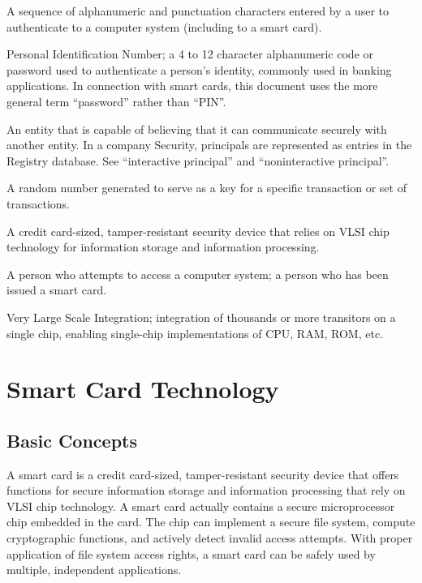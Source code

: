 \begin{htmllist}
 A sequence of alphanumeric and punctuation characters entered by a user
 to authenticate to a computer system (including to a smart card).

 \item[PIN]
  
 Personal Identification Number; a 4 to 12 character alphanumeric code or
 password used to authenticate a person's identity, commonly used in
 banking applications. In connection with smart cards, this document uses
 the more general term ``password'' rather than ``PIN''.

 \item[Principal]
  
 An entity that is capable of believing that it can communicate securely
 with another entity. In a company Security, principals are represented as
 entries in the Registry database. See ``interactive principal'' and
 ``noninteractive principal''.

 \item[Session key]
  
 A random number generated to serve as a key for a specific transaction or
 set of transactions.
  
 \item[Smart card]
  
 A credit card-sized, tamper-resistant security device that relies on VLSI
 chip technology for information storage and information processing.

 \item[User]
  
 A person who attempts to access a computer system; a person who has been
 issued a smart card.

 \item[VLSI]
  
 Very Large Scale Integration; integration of thousands or more transitors
 on a single chip, enabling single-chip implementations of CPU, RAM, ROM,
 etc.
\end{htmllist}


\section{Smart Card Technology}

\subsection{Basic Concepts}

A smart card is a credit card-sized, tamper-resistant security device
that offers functions for secure information storage and information
processing that rely on VLSI chip technology. A smart card actually
contains a secure microprocessor chip embedded in the card. The chip
can implement a secure file system, compute cryptographic functions,
and actively detect invalid access attempts. With proper application of
file system access rights, a smart card can be safely used by multiple,
independent applications.\\

